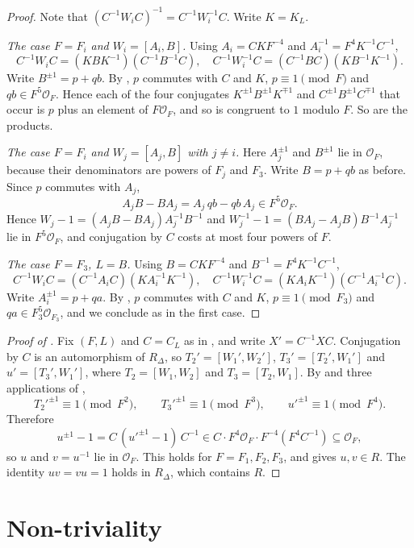 \documentclass[11pt,colorlinks]{charlie}
\begin{document}
\begin{proof}
Note that $(C^{-1}W_iC)^{-1}=C^{-1}W_i^{-1}C$. Write $K=K_L$.

\emph{The case $F=F_i$ and $W_i=[A_i,B]$.} Using $A_i=CKF^{-4}$ and $A_i^{-1}=F^4K^{-1}C^{-1}$,
\[
  C^{-1}W_iC=(KBK^{-1})(C^{-1}B^{-1}C),\quad C^{-1}W_i^{-1}C=(C^{-1}BC)(KB^{-1}K^{-1}).
\]
Write $B^{\pm1}=p+qb$. By , $p$ commutes with $C$ and $K$, $p\equiv1\pmod F$ and $qb\in F^5\mathcal O_F$. Hence each of the four conjugates $K^{\pm1}B^{\pm1}K^{\mp1}$ and $C^{\pm1}B^{\pm1}C^{\mp1}$ that occur is $p$ plus an element of $F\mathcal O_F$, and so is congruent to $1$ modulo $F$. So are the products.

\emph{The case $F=F_i$ and $W_j=[A_j,B]$ with $j\ne i$.} Here $A_j^{\pm1}$ and $B^{\pm1}$ lie in $\mathcal O_F$, because their denominators are powers of $F_j$ and $F_3$. Write $B=p+qb$ as before. Since $p$ commutes with $A_j$,
\[
  A_jB-BA_j=A_j\,qb-qb\,A_j\in F^5\mathcal O_F .
\]
Hence $W_j-1=(A_jB-BA_j)A_j^{-1}B^{-1}$ and $W_j^{-1}-1=(BA_j-A_jB)B^{-1}A_j^{-1}$ lie in $F^5\mathcal O_F$, and conjugation by $C$ costs at most four powers of $F$.

\emph{The case $F=F_3$, $L=B$.} Using $B=CKF^{-4}$ and $B^{-1}=F^4K^{-1}C^{-1}$,
\[
  C^{-1}W_iC=(C^{-1}A_iC)(KA_i^{-1}K^{-1}),\quad C^{-1}W_i^{-1}C=(KA_iK^{-1})(C^{-1}A_i^{-1}C).
\]
Write $A_i^{\pm1}=p+qa$. By , $p$ commutes with $C$ and $K$, $p\equiv1\pmod{F_3}$ and $qa\in F_3^5\mathcal O_{F_3}$, and we conclude as in the first case.
\end{proof}

\begin{proof}[Proof of ]
Fix $(F,L)$ and $C=C_L$ as in , and write $X'=C^{-1}XC$. Conjugation by $C$ is an automorphism of $R_\Delta$, so $T_2'=[W_1',W_2']$, $T_3'=[T_2',W_1']$ and $u'=[T_3',W_1']$, where $T_2=[W_1,W_2]$ and $T_3=[T_2,W_1]$. By  and three applications of ,
\[
  T_2'^{\pm1}\equiv1\pmod{F^2},\qquad T_3'^{\pm1}\equiv1\pmod{F^3},\qquad u'^{\pm1}\equiv1\pmod{F^4}.
\]
Therefore
\[
  u^{\pm1}-1=C\,(u'^{\pm1}-1)\,C^{-1}\in C\cdot F^4\mathcal O_F\cdot F^{-4}(F^4C^{-1})\subseteq\mathcal O_F ,
\]
so $u$ and $v=u^{-1}$ lie in $\mathcal O_F$. This holds for $F=F_1,F_2,F_3$, and  gives $u,v\in R$. The identity $uv=vu=1$ holds in $R_\Delta$, which contains $R$.
\end{proof}

\section{Non-triviality}\label{sec:nontrivial}
\end{document}
